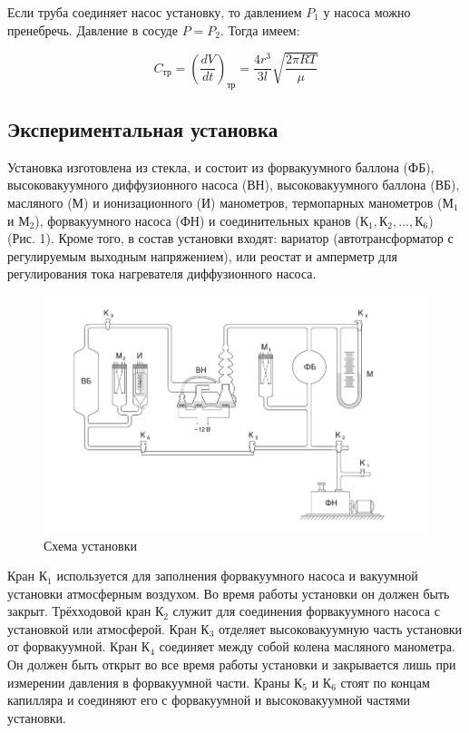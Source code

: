 \documentclass[a4paper, 12pt]{article}
\begin{document}
Если труба соединяет насос установку, то давлением $P_1$ у насоса можно пренебречь. Давление в сосуде $P = P_2$. Тогда имеем:

\bigskip

\begin{equation}
    C_\text{тр} = \left(\frac{dV}{dt}\right)_\text{тр} = \frac{4r^3}{3l}\sqrt{\frac{2\pi RT}{\mu}}
\end{equation}


\subsection*{Экспериментальная установка}

\; \; Установка изготовлена из стекла,
и состоит из форвакуумного баллона (ФБ), высоковакуумного диффузионного насоса (ВН), высоковакуумного баллона (ВБ), масляного (М) и ионизационного (И) манометров, термопарных манометров ($\text{М}_1$ и $\text{М}_2$), форвакуумного насоса (ФН) и соединительных кранов ($К_1, К_2,..., К_6$) (Рис. 1). Кроме того, в состав установки входят: вариатор (автотрансформатор с регулируемым выходным напряжением), или реостат и амперметр для регулирования тока нагревателя диффузионного насоса.

\begin{figure}[H]
 	\centering
 	\includegraphics[width=0.7 \textheight]{1.jpg}
 	\caption{Схема установки}
 	\label{fig:Схема установки}
\end{figure}

Кран $К_1$ используется для заполнения форвакуумного насоса и вакуумной установки атмосферным воздухом. Во время работы установки
он должен быть закрыт. Трёхходовой кран $К_2$ служит для соединения
форвакуумного насоса с установкой или атмосферой. Кран $К_3$ отделяет
высоковакуумную часть установки от форвакуумной. Кран $К_4$ соединяет между собой колена масляного манометра. Он должен быть открыт во все время работы установки и закрывается лишь при измерении
давления в форвакуумной части. Краны $К_5$ и $К_6$ стоят по концам капилляра и соединяют его с форвакуумной и высоковакуумной частями установки. 
\end{document}
